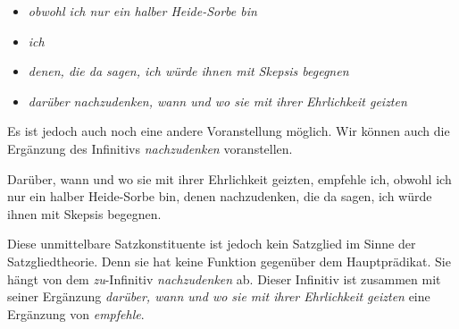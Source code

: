 \begin{itemize}

\item \textit{obwohl ich nur ein halber Heide-Sorbe bin}

\item \textit{ich} 

\item \textit{denen, die da sagen, ich würde ihnen mit Skepsis begegnen}

\item \textit{darüber nachzudenken, wann und wo sie mit ihrer Ehrlichkeit geizten}

\end{itemize}

Es ist jedoch auch noch eine andere Voranstellung möglich. Wir können auch die Ergänzung des Infinitivs \textit{nachzudenken} voranstellen.

\ea \label{ea:K1_V1_4} Darüber, wann und wo sie mit ihrer Ehrlichkeit geizten, empfehle ich, obwohl ich nur ein halber Heide-Sorbe bin, denen nachzudenken, die da sagen, ich würde ihnen mit Skepsis begegnen.
\z 

Diese unmittelbare Satzkonstituente ist jedoch kein Satzglied im Sinne der Satzgliedtheorie. Denn sie hat keine Funktion gegenüber dem Hauptprädikat. Sie hängt von dem \textit{zu}-Infinitiv \textit{nachzudenken} ab. Dieser Infinitiv ist zusammen mit seiner Ergänzung \textit{darüber, wann und wo sie mit ihrer Ehrlichkeit geizten} eine Ergänzung von \textit{empfehle}.   
